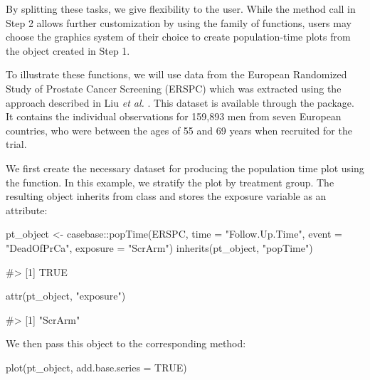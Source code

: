 By splitting these tasks, we give flexibility to the user. While the
method call in Step 2 allows further customization by using the
 \citep{ggplot2} family of functions, users may choose
the graphics system of their choice to create population-time plots from
the object created in Step 1.

To illustrate these functions, we will use data from the European
Randomized Study of Prostate Cancer Screening (ERSPC)
\citep{schroder2009screening} which was extracted using the approach
described in Liu \emph{et al.} \citeyearpar{liu2014recovering}. This
dataset is available through the  package. It contains the
individual observations for 159,893 men from seven European countries,
who were between the ages of 55 and 69 years when recruited for the
trial.

We first create the necessary dataset for producing the population time
plot using the  function. In this example, we stratify the
plot by treatment group. The resulting object inherits from class
 and stores the exposure variable as an attribute:

\begin{Schunk}
\begin{Sinput}
pt_object <- casebase::popTime(ERSPC, time = "Follow.Up.Time",
                               event = "DeadOfPrCa", exposure = "ScrArm")
inherits(pt_object, "popTime")
\end{Sinput}
\begin{Soutput}
#> [1] TRUE
\end{Soutput}
\begin{Sinput}
attr(pt_object, "exposure")
\end{Sinput}
\begin{Soutput}
#> [1] "ScrArm"
\end{Soutput}
\end{Schunk}

We then pass this object to the corresponding  method:

\begin{Schunk}
\begin{Sinput}
plot(pt_object, add.base.series = TRUE)
\end{Sinput}
\end{Schunk}

